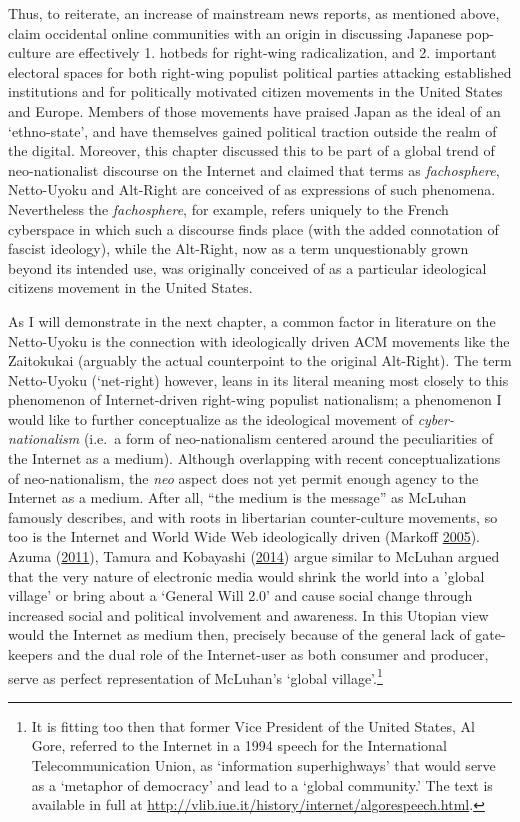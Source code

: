 \documentclass[10pt,british,A4paper,,openany]{memoir}
\begin{document}
Thus, to reiterate, an increase of mainstream news reports, as mentioned
above, claim occidental online communities with an origin in discussing
Japanese pop-culture are effectively 1. hotbeds for right-wing
radicalization, and 2. important electoral spaces for both right-wing
populist political parties attacking established institutions and for
politically motivated citizen movements in the United States and Europe.
Members of those movements have praised Japan as the ideal of an
`ethno-state', and have themselves gained political traction outside the
realm of the digital. Moreover, this chapter discussed this to be part
of a global trend of neo-nationalist discourse on the Internet and
claimed that terms as \emph{fachosphere}, Netto-Uyoku and Alt-Right are
conceived of as expressions of such phenomena. Nevertheless the
\emph{fachosphere}, for example, refers uniquely to the French
cyberspace in which such a discourse finds place (with the added
connotation of fascist ideology), while the Alt-Right, now as a term
unquestionably grown beyond its intended use, was originally conceived
of as a particular ideological citizens movement in the United States.

As I will demonstrate in the next chapter, a common factor in literature
on the Netto-Uyoku is the connection with ideologically driven ACM
movements like the Zaitokukai (arguably the actual counterpoint to the
original Alt-Right). The term Netto-Uyoku (`net-right) however, leans in
its literal meaning most closely to this phenomenon of Internet-driven
right-wing populist nationalism; a phenomenon I would like to further
conceptualize as the ideological movement of \emph{cyber-nationalism}
(i.e.~a form of neo-nationalism centered around the peculiarities of the
Internet as a medium). Although overlapping with recent
conceptualizations of neo-nationalism, the \emph{neo} aspect does not
yet permit enough agency to the Internet as a medium. After all, ``the
medium is the message'' as McLuhan famously describes, and with roots in
libertarian counter-culture movements, so too is the Internet and World
Wide Web ideologically driven (Markoff
\protect\hyperlink{ref-markoff_what_2005}{2005}). Azuma
(\protect\hyperlink{ref-azuma_ippan_2011}{2011}), Tamura and Kobayashi
(\protect\hyperlink{ref-tamura_niggling_2014}{2014}) argue similar to
McLuhan argued that the very nature of electronic media would shrink the
world into a 'global village' or bring about a `General Will 2.0' and
cause social change through increased social and political involvement
and awareness. In this Utopian view would the Internet as medium then,
precisely because of the general lack of gate-keepers and the dual role
of the Internet-user as both consumer and producer, serve as perfect
representation of McLuhan's `global village'.\footnote{It is fitting too
  then that former Vice President of the United States, Al Gore,
  referred to the Internet in a 1994 speech for the International
  Telecommunication Union, as `information superhighways' that would
  serve as a `metaphor of democracy' and lead to a `global community.'
  The text is available in full at
  \url{http://vlib.iue.it/history/internet/algorespeech.html}.}
\end{document}

